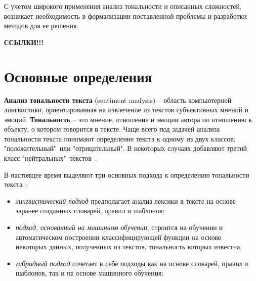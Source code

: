 С учетом широкого применения анализ тональности и описанных сложностей,
возникает необходимость в формализации поставленной проблемы и разработки
методов для ее решения.

\textbf{ССЫЛКИ!!!}

\section{Основные определения}

\textbf{Анализ тональности текста} (sentiment analysis) -- область компьютерной
лингвистики, ориентированная на извлечение из текстов субъективных мнений и
эмоций. \textbf{Тональность} -- это мнение, отношение и эмоции автора по
отношению к объекту, о котором говорится в тексте.  Чаще всего под задачей
анализа тональности текста понимают определение текста к одному из двух классов:
"положительный"\ или "отрицательный". В некоторых случаях добавляют третий класс
"нейтральных"\ текстов~\cite{article9}.

В настоящее время выделяют три основных подхода к определению тональности
текста~\cite{article9}:
\begin{itemize}
    \item \textit{лингвистический подход} предполагает анализ лексики в тексте на
        основе заранее созданных словарей, правил и шаблонов;

    \item \textit{подход, основанный на машинном обучении}, строится на обучении и
        автоматическом построении классифицирующей функции на основе
        некоторых данных, полученных из текстов, тональность которых
        известна;

    \item \textit{гибридный подход} сочетает в себе подходы как на основе
        словарей, правил и шаблонов, так и на основе машинного обучения;
\end{itemize}


